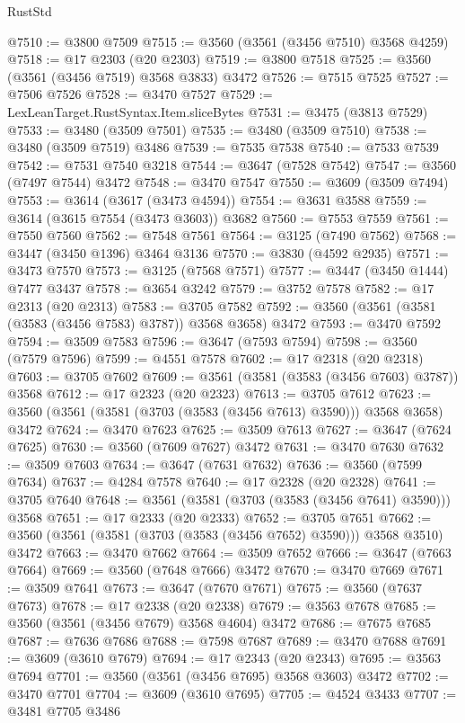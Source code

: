 \begin{lexlean}{RustStd}
\begin{coremodule}
@7510 := @3800 @7509
@7515 := @3560 (@3561 (@3456 @7510) @3568 @4259)
@7518 := @17 @2303 (@20 @2303)
@7519 := @3800 @7518
@7525 := @3560 (@3561 (@3456 @7519) @3568 @3833) @3472
@7526 := @7515 @7525
@7527 := @7506 @7526
@7528 := @3470 @7527
@7529 := LexLeanTarget.RustSyntax.Item.sliceBytes
@7531 := @3475 (@3813 @7529)
@7533 := @3480 (@3509 @7501)
@7535 := @3480 (@3509 @7510)
@7538 := @3480 (@3509 @7519) @3486
@7539 := @7535 @7538
@7540 := @7533 @7539
@7542 := @7531 @7540 @3218
@7544 := @3647 (@7528 @7542)
@7547 := @3560 (@7497 @7544) @3472
@7548 := @3470 @7547
@7550 := @3609 (@3509 @7494)
@7553 := @3614 (@3617 (@3473 @4594))
@7554 := @3631 @3588
@7559 := @3614 (@3615 @7554 (@3473 @3603)) @3682
@7560 := @7553 @7559
@7561 := @7550 @7560
@7562 := @7548 @7561
@7564 := @3125 (@7490 @7562)
@7568 := @3447 (@3450 @1396) @3464 @3136
@7570 := @3830 (@4592 @2935)
@7571 := @3473 @7570
@7573 := @3125 (@7568 @7571)
@7577 := @3447 (@3450 @1444) @7477 @3437
@7578 := @3654 @3242
@7579 := @3752 @7578
@7582 := @17 @2313 (@20 @2313)
@7583 := @3705 @7582
@7592 := @3560 (@3561 (@3581 (@3583 (@3456 @7583) @3787)) @3568 @3658) @3472
@7593 := @3470 @7592
@7594 := @3509 @7583
@7596 := @3647 (@7593 @7594)
@7598 := @3560 (@7579 @7596)
@7599 := @4551 @7578
@7602 := @17 @2318 (@20 @2318)
@7603 := @3705 @7602
@7609 := @3561 (@3581 (@3583 (@3456 @7603) @3787)) @3568
@7612 := @17 @2323 (@20 @2323)
@7613 := @3705 @7612
@7623 := @3560 (@3561 (@3581 (@3703 (@3583 (@3456 @7613) @3590))) @3568 @3658) @3472
@7624 := @3470 @7623
@7625 := @3509 @7613
@7627 := @3647 (@7624 @7625)
@7630 := @3560 (@7609 @7627) @3472
@7631 := @3470 @7630
@7632 := @3509 @7603
@7634 := @3647 (@7631 @7632)
@7636 := @3560 (@7599 @7634)
@7637 := @4284 @7578
@7640 := @17 @2328 (@20 @2328)
@7641 := @3705 @7640
@7648 := @3561 (@3581 (@3703 (@3583 (@3456 @7641) @3590))) @3568
@7651 := @17 @2333 (@20 @2333)
@7652 := @3705 @7651
@7662 := @3560 (@3561 (@3581 (@3703 (@3583 (@3456 @7652) @3590))) @3568 @3510) @3472
@7663 := @3470 @7662
@7664 := @3509 @7652
@7666 := @3647 (@7663 @7664)
@7669 := @3560 (@7648 @7666) @3472
@7670 := @3470 @7669
@7671 := @3509 @7641
@7673 := @3647 (@7670 @7671)
@7675 := @3560 (@7637 @7673)
@7678 := @17 @2338 (@20 @2338)
@7679 := @3563 @7678
@7685 := @3560 (@3561 (@3456 @7679) @3568 @4604) @3472
@7686 := @7675 @7685
@7687 := @7636 @7686
@7688 := @7598 @7687
@7689 := @3470 @7688
@7691 := @3609 (@3610 @7679)
@7694 := @17 @2343 (@20 @2343)
@7695 := @3563 @7694
@7701 := @3560 (@3561 (@3456 @7695) @3568 @3603) @3472
@7702 := @3470 @7701
@7704 := @3609 (@3610 @7695)
@7705 := @4524 @3433
@7707 := @3481 @7705 @3486

\end{coremodule}
\end{lexlean}
